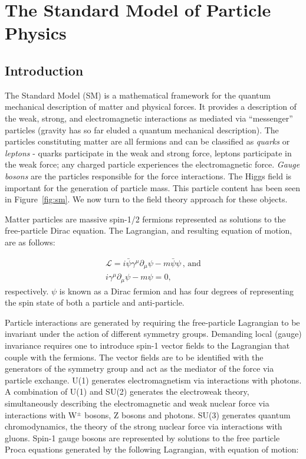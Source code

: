 \chapter{The Standard Model of Particle Physics}
\label{chap:sm}

\section{Introduction}

The Standard Model (SM) is a mathematical framework for the quantum mechanical description of matter and physical forces. It provides a description of the weak, strong, and electromagnetic interactions as mediated via ``messenger'' particles (gravity has so far eluded a quantum mechanical description). The particles constituting matter are all fermions and can be classified as \textit{quarks} or \textit{leptons} - quarks participate in the weak and strong force, leptons participate in the weak force; any charged particle experiences the electromagnetic force. \textit{Gauge bosons} are the particles responsible for the force interactions. The Higgs field is important for the generation of particle mass. This particle content has been seen in Figure~\ref{fig:sm}. We now turn to the field theory approach for these objects.

Matter particles are massive spin-1/2 fermions represented as solutions to the free-particle Dirac equation. The Lagrangian, and resulting equation of motion, are as follows:

\begin{equation}
\begin{array}{l}
\mathcal{L} = i\bar{\psi}\gamma^{\mu}\partial_{\mu}\psi - m\bar{\psi}\psi\,,\,\textrm{and}\\
i\gamma^{\mu}\partial_{\mu}\psi - m\psi = 0,
\end{array}
\end{equation}
respectively. $\psi$ is known as a Dirac fermion and has four degrees of representing the spin state of both a particle and anti-particle.

Particle interactions are generated by requiring the free-particle Lagrangian to be invariant under the action of different symmetry groups. Demanding local (gauge) invariance requires one to introduce spin-1 vector fields to the Lagrangian that couple with the fermions. The vector fields are to be identified with the generators of the symmetry group and act as the mediator of the force via particle exchange. U(1) generates electromagnetism via interactions with photons. A combination of U(1) and SU(2) generates the electroweak theory, simultaneously describing the electromagnetic and weak nuclear force via interactions with W$^{\pm}$ bosons, Z bosons and photons. SU(3) generates quantum chromodynamics, the theory of the strong nuclear force via interactions with gluons.  Spin-1 gauge bosons are represented by solutions to the free particle Proca equations generated by the following Lagrangian, with equation of motion:

